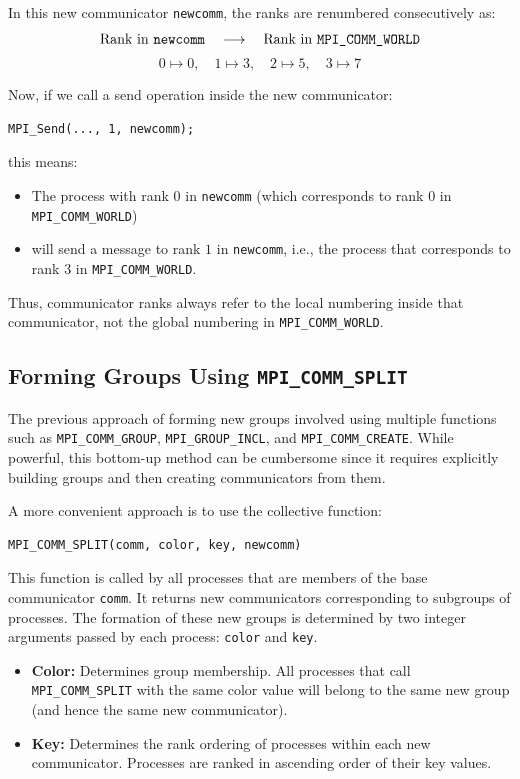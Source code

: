 \documentclass[12pt]{book}
\begin{document}
In this new communicator \texttt{newcomm}, the ranks are renumbered consecutively as:
\[
\text{Rank in \texttt{newcomm}} \quad \longrightarrow \quad \text{Rank in \texttt{MPI\_COMM\_WORLD}}
\]
\[
0 \mapsto 0, \quad 1 \mapsto 3, \quad 2 \mapsto 5, \quad 3 \mapsto 7
\]

Now, if we call a send operation inside the new communicator:
\begin{lstlisting}[style=cppstyle, caption={Send operation in new communicator}]
MPI_Send(..., 1, newcomm);
\end{lstlisting}

this means:  
\begin{itemize}
    \item The process with rank $0$ in \texttt{newcomm} (which corresponds to rank $0$ in \texttt{MPI\_COMM\_WORLD})  
    \item will send a message to rank $1$ in \texttt{newcomm}, i.e., the process that corresponds to rank $3$ in \texttt{MPI\_COMM\_WORLD}.  
\end{itemize}

Thus, communicator ranks always refer to the local numbering inside that communicator, not the global numbering in \texttt{MPI\_COMM\_WORLD}.

\subsection{Forming Groups Using \texttt{MPI\_COMM\_SPLIT}}
The previous approach of forming new groups involved using multiple functions such as \texttt{MPI\_COMM\_GROUP}, \texttt{MPI\_GROUP\_INCL}, and \texttt{MPI\_COMM\_CREATE}.  
While powerful, this bottom-up method can be cumbersome since it requires explicitly building groups and then creating communicators from them.

A more convenient approach is to use the collective function:
\begin{lstlisting}[style=cppstyle, caption={MPI communicator split function}]
MPI_COMM_SPLIT(comm, color, key, newcomm)
\end{lstlisting}

This function is called by all processes that are members of the base communicator \texttt{comm}.  
It returns new communicators corresponding to subgroups of processes. The formation of these new groups is determined by two integer arguments passed by each process: \texttt{color} and \texttt{key}.  

\begin{itemize}
    \item \textbf{Color:} Determines group membership. All processes that call \texttt{MPI\_COMM\_SPLIT} with the same color value will belong to the same new group (and hence the same new communicator).
    \item \textbf{Key:} Determines the rank ordering of processes within each new communicator. Processes are ranked in ascending order of their key values.
\end{itemize}
\end{document}
